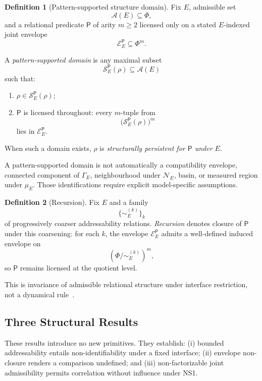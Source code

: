 \documentclass[aps,prx,onecolumn,11pt]{revtex4-2}
\theoremstyle{plain}
\theoremstyle{definition}
\newtheorem{definition}{Definition}
\theoremstyle{remark}
\begin{document}
\begin{definition}[Pattern-supported structure domain]
\label{def:pattern_supported_domain}
Fix \(E\), admissible set
\[
\mathcal{A}(E)\subseteq\Phi,
\]
and a relational predicate \(\mathsf{P}\) of arity \(m\geq 2\) licensed
only on a stated \(E\)-indexed joint envelope
\[
\mathcal{E}^{\mathsf P}_E\subseteq\Phi^m.
\]

A \emph{pattern-supported domain} is any maximal subset
\[
\mathcal{S}^{\mathsf P}_E(\rho)
\subseteq
\mathcal{A}(E)
\]
such that:
\begin{enumerate}[label=(\roman*), leftmargin=2.2em]
\item \(\rho\in\mathcal{S}^{\mathsf P}_E(\rho)\);
\item \(\mathsf P\) is licensed throughout: every \(m\)-tuple from
\[
\bigl(\mathcal{S}^{\mathsf P}_E(\rho)\bigr)^m
\]
lies in \(\mathcal{E}^{\mathsf P}_E\).
\end{enumerate}

When such a domain exists, \(\rho\) is \emph{structurally persistent for
\(\mathsf P\) under \(E\)}.
\end{definition}

A pattern-supported domain is not automatically a compatibility
envelope, connected component of \(\Gamma_E\), neighbourhood under
\(\mathcal N_E\), basin, or measured region under \(\mu_E\). Those
identifications require explicit model-specific assumptions.

\begin{definition}[Recursion]
\label{def:recursion_structural_closure}
Fix \(E\) and a family
\[
\{\sim^{(k)}_E\}_k
\]
of progressively coarser addressability relations. \emph{Recursion}
denotes closure of \(\mathsf P\) under this coarsening: for each \(k\),
the envelope \(\mathcal{E}^{\mathsf P}_E\) admits a well-defined induced
envelope on
\[
(\Phi/{\sim^{(k)}_E})^m,
\]
so \(\mathsf P\) remains licensed at the quotient level.

This is invariance of admissible relational structure under interface
restriction, not a dynamical rule~\cite{Watrous2018,NielsenChuang2010,
Petz1986,Wilde2017}.
\end{definition}

\subsection{Three Structural Results}
\label{sec:three_hard_results}

These results introduce no new primitives. They establish:
(i) bounded addressability entails non-identifiability under a fixed
interface; (ii) envelope non-closure renders a comparison undefined;
and (iii) non-factorizable joint admissibility permits correlation
without influence under NS1.
\end{document}
